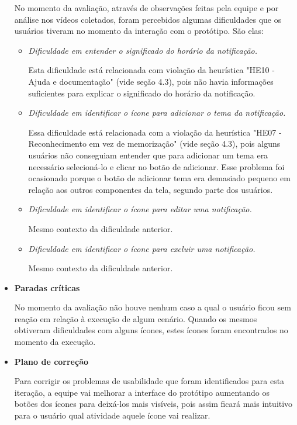 \begin{itemize}
	  \subitem No momento da avaliação, através de observações feitas pela equipe e por análise nos vídeos coletados,
	  foram percebidos algumas dificuldades que os usuários tiveram no momento da interação com o protótipo. São elas:
	  
	  \begin{itemize}
	  
	  \item \emph{Dificuldade em entender o significado do horário da notificação.}
	    
	    \subitem Esta dificuldade está relacionada com violação da heurística "HE10 - Ajuda e documentação" (vide seção 4.3),
	    pois não havia informações suficientes para explicar o significado do horário da notificação.
	  
	  \item \emph{Dificuldade em identificar o ícone para adicionar o tema da notificação.}
	    
	    \subitem Essa dificuldade está relacionada com a violação da heurística "HE07 - Reconhecimento em vez de memorização" (vide seção 4.3),
	    pois alguns usuários não conseguiam entender que para adicionar um tema era necessário selecioná-lo e clicar no botão de
	    adicionar. Esse problema foi ocasionado porque o botão de adicionar tema era demasiado pequeno em relação
	    aos outros componentes da tela, segundo parte dos usuários. 
	  
	  \item \emph{Dificuldade em identificar o ícone para editar uma notificação.}
	    
	    \subitem Mesmo contexto da dificuldade anterior.
	    
	  \item \emph{Dificuldade em identificar o ícone para excluir uma notificação.}
	    
	    \subitem Mesmo contexto da dificuldade anterior.
	  
	  \end{itemize}
       
       \item \textbf{Paradas críticas}
       
	  \subitem No momento da avaliação não houve nenhum caso a qual o usuário ficou sem reação em relação à execução de algum cenário. 
	  Quando os mesmos obtiveram dificuldades com alguns ícones, estes ícones foram encontrados no momento da execução.
       
       \item \textbf{Plano de correção}
       
	  \subitem Para corrigir os problemas de usabilidade que foram identificados para esta iteração, a equipe vai melhorar a
	  interface do protótipo aumentando os botões dos ícones para deixá-los mais visíveis, pois assim ficará mais intuitivo
	  para o usuário qual atividade aquele ícone vai realizar.
       
      \end{itemize}
      
